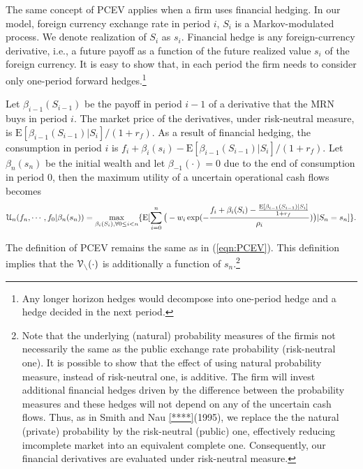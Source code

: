 \documentclass[mnsc,nonblindrev,copyedit]{informs2_wz} %
\newcommand{\E}{\mathrm{E}}
\newcommand{\V}{\cal{V}}
\begin{document}
The same concept of PCEV applies when a firm uses financial hedging.  In our model, foreign currency exchange rate in period $i$, $S_i$ is a Markov-modulated process.  We denote realization of $S_i$ as $s_i$.  
Financial hedge is any foreign-currency derivative, i.e., a future payoff as a function of the future realized value $s_i$ of the foreign currency. 
It is easy to show that, in each period the firm needs to consider only one-period forward hedges.\footnote{Any longer horizon hedges would decompose into one-period hedge and a hedge decided in the next period.}

Let $\beta_{i-1}(S_{i-1})$ be the payoff in period $i-1$ of a derivative that the MRN buys in period $i$. The market price of the derivatives,   under risk-neutral measure, is $\E[\beta_{i-1}(S_{i-1})|S_i]/(1+r_f)$. As a result of financial hedging, the consumption in period $i$ is $f_i + \beta_{i}(s_i) - \E[\beta_{i-1} (S_{i-1})|S_i]/(1+r_f)$. Let $\beta_{n}(s_n)$ be the initial wealth  and let $\beta_{-1}(\cdot)=0$ due to the end of consumption in period $0$, then the maximum utility of a uncertain operational cash flows becomes
\begin{eqnarray} 
    \label{eqn:maxU-FH}
\mathcal{U}_n(f_{n},\cdots,f_0|\beta _{n}(s_n) )  =\max_{\beta_{i}(S_{i}), \forall 0\leq i< n} \{\E [\sum_{i=0}^n \big{(}-w_{i}\exp(-\frac{f_{i} + \beta_{i}(S_i)-\frac{\E[\beta_{i-1}(S_{i-1})|S_i]}{1+r_f}}{\rho_i})\big{)}  |S_n=s_n]\}.
\end{eqnarray}

The definition of  PCEV remains the same as in (\ref{eqn:PCEV}). %
This definition implies that the $\V_n(\cdot)$ is additionally a function of $s_n$.\footnote{Note that the underlying (natural) probability measures of the firmis not necessarily the same as the public exchange rate probability (risk-neutral one).  It is possible to show that the effect of using natural probability measure, instead of risk-neutral one, is additive.  The firm will invest additional financial hedges driven by the difference between the probability measures and these hedges will not depend on any of the uncertain cash flows.  Thus, as in Smith and Nau \ref{****}(1995), we replace the the natural (private) probability by the risk-neutral (public) one, effectively reducing imcomplete market into an equivalent complete one. Consequently, our financial derivatives are evaluated under risk-neutral measure.}
\end{document}
